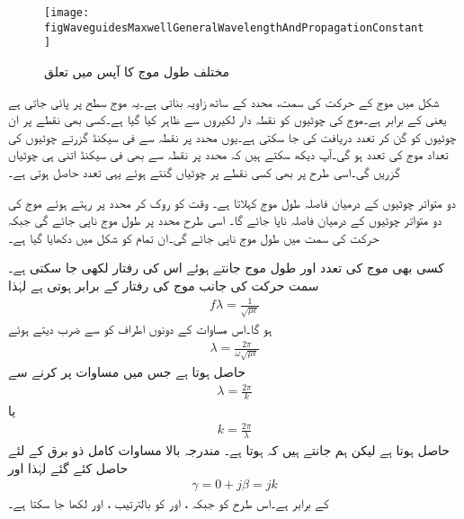 \begin{figure}
\centering
\texttt{[image: figWaveguidesMaxwellGeneralWavelengthAndPropagationConstant]}
\caption{مختلف طول موج کا آپس میں تعلق}
\label{شکل_مویج_مختلف_طول_موج}
\end{figure}

شکل  میں موج کے حرکت کی سمت،  محدد کے ساتھ  زاویہ بناتی ہے۔یہ موج  سطح پر پائی جاتی ہے یعنی  کے برابر ہے۔موج کی چوٹیوں کو نقطہ دار لکیروں سے ظاہر کیا گیا ہے۔کسی بھی نقطے پر ان چوٹیوں کو گن کر تعدد دریافت کی جا سکتی ہے۔یوں  محدد پر نقطہ  سے فی سیکنڈ گزرتے چوٹیوں کی تعداد  موج کی تعدد  ہو گی۔آپ دیکھ سکتے ہیں کہ  محدد پر نقطہ  سے بھی  فی سیکنڈ اتنی ہی چوٹیاں گزریں گی۔اسی طرح  پر بھی کسی نقطے پر چوٹیاں گنتے ہوئے  یہی تعدد حاصل ہوتی ہے۔

دو متواتر چوٹیوں کے درمیان فاصلہ طول موج کہلاتا ہے۔ وقت  کو روک کر  محدد پر رہتے ہوئے موج کی دو متواتر چوٹیوں کے درمیان فاصلہ  ناپا جائے گا۔ اسی طرح  محدد پر طول موج  ناپی جائے گی جبکہ حرکت کی سمت میں طول موج  ناپی جائے گی۔ان تمام کو شکل  میں دکھایا گیا ہے۔

کسی بھی موج کی تعدد  اور طول موج   جانتے ہوئے اس کی رفتار  لکھی جا سکتی ہے۔سمت حرکت کی جانب موج کی رفتار  کے برابر ہوتی ہے لہٰذا
\begin{align}
f \lambda=\frac{1}{\sqrt{\mu \epsilon}}
\end{align}
ہو گا۔اس مساوات کے دونوں اطراف کو  سے ضرب دیتے ہوئے
\begin{align}
\lambda=\frac{2\pi}{\omega \sqrt{\mu \epsilon}}
\end{align}
حاصل ہوتا ہے جس میں مساوات  پر کرنے سے
\begin{align}
\lambda=\frac{2\pi}{k}
\end{align}
یا
\begin{align}\label{مساوات_مویج_گھمکی_عمومی_ڈ}
k=\frac{2\pi}{\lambda}
\end{align}
حاصل ہوتا ہے لیکن ہم جانتے ہیں کہ  ہوتا ہے۔ مندرجہ بالا مساوات کامل ذو برق  کے لئے حاصل کئے گئے لہٰذا   اور
\begin{align}
\gamma=0+j\beta=j k
\end{align} 
کے برابر ہے۔اس طرح  کو  جبکہ ،  اور  کو بالترتیب ، اور  لکھا جا سکتا ہے۔

